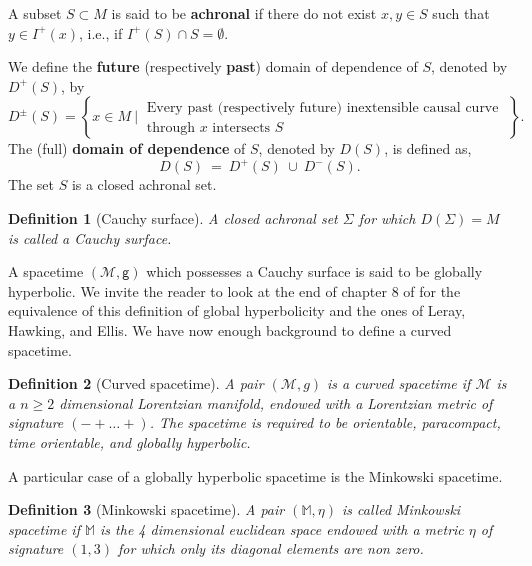 \documentclass[11pt]{book}
\newcommand{\Mcal}{\mathcal{M}}
\newcommand{\Mbb}{\mathbb{M}}
\newcommand{\gsf}{\mathsf{g}}
\theoremstyle{break}
\newtheorem{definition}{Definition}[chapter]
\begin{document}
A subset $S \subset M$ is said to be \textbf{achronal} if there do not exist $x, y \in S$ such that $y \in I^{+}(x)$, i.e., if $I^{+}(S) \cap S = \emptyset$. 


We define the \textbf{future} (respectively \textbf{past}) domain of dependence of $S$, denoted by $D^{+}(S)$, by
%
\begin{equation*}
D^{\pm}(S) = \left\{ x \in M \ \bigg| \ \begin{array}{l} \text{Every past (respectively future) inextensible causal curve} \\ \text{through $x$ intersects $S$} \end{array} \; \right\}.
\end{equation*}
%
The (full) \textbf{domain of dependence} of $S$, denoted by $D(S)$, is defined as,
\begin{equation*}
D(S) \ = \ D^{+}(S) \ \cup \ D^{-}(S).
\end{equation*}
The set $S$ is a closed achronal set.


\bigskip


\begin{definition}[Cauchy surface]
A closed achronal set $\Sigma$ for which $D(\Sigma) = M$ is called a Cauchy surface. 
\end{definition}

A spacetime $(\Mcal,\gsf)$ which possesses a Cauchy surface is said to be globally hyperbolic. We invite the reader to look at the end of chapter $8$ of \cite{WALD_1984} for the equivalence of this definition of global hyperbolicity and the ones of Leray, Hawking, and Ellis. 
We have now enough background to define a curved spacetime.

\begin{definition}[Curved spacetime]\label{def:cst}
A pair $(\Mcal,g)$ is a curved spacetime if $\Mcal$ is a $n \geq 2$ dimensional Lorentzian manifold, endowed with a Lorentzian metric of signature $( - + \dots +)$. The spacetime is required to be orientable, paracompact, time orientable, and globally hyperbolic. 
\end{definition}


A particular case of a globally hyperbolic spacetime is the Minkowski spacetime.


\begin{definition}[Minkowski spacetime]\label{def:minkowski}
A pair $(\Mbb,\eta)$ is called Minkowski spacetime if $\Mbb$ is the 4 dimensional euclidean space endowed with a metric $\eta$ of signature $(1,3)$ for which only its diagonal elements are non zero.
\end{definition}
\end{document}
